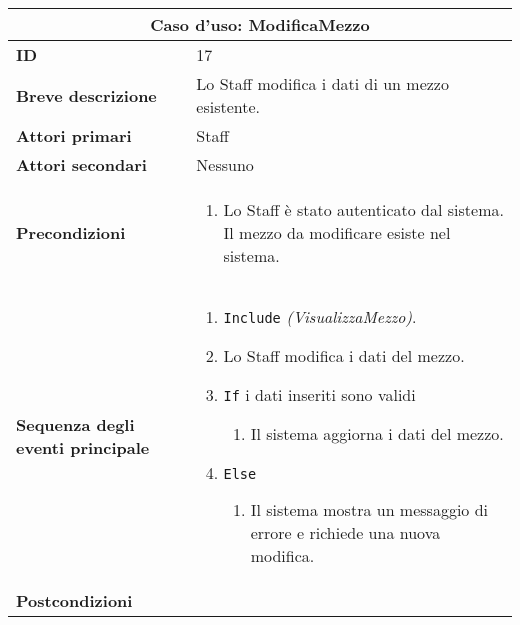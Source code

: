 \documentclass[a4paper]{report}
\begin{document}
\clearpage
\begin{table}[H]
\vspace*{-0cm}
\renewcommand{\arraystretch}{1.9}
\begin{tabular}{|p{3.9cm}|p{9.9cm}|}
\hline
\multicolumn{2}{|c|}{\textbf{Caso d’uso: ModificaMezzo}} \\ \hline
	\textbf{ID} & 17 \\ \hline
	\textbf{Breve descrizione} & Lo Staff modifica i dati di un mezzo esistente. \\ \hline
	\textbf{Attori primari} & Staff \\ \hline
	\textbf{Attori secondari} & Nessuno \\ \hline
	\textbf{Precondizioni} & \begin{enumerate}[label=\arabic*.,leftmargin=14pt,labelsep=0.5em,topsep=0pt,partopsep=0pt,parsep=0pt,itemsep=0pt]
        \item Lo Staff è stato autenticato dal sistema. Il mezzo da modificare esiste nel sistema.
    \end{enumerate} \\ \hline
	\textbf{Sequenza degli eventi principale} & 
\begin{enumerate}[leftmargin=14pt,label=\arabic*.,labelsep=0.5em,topsep=0pt,partopsep=0pt,parsep=0pt,itemsep=0pt]
    \item \texttt{Include} \textit{(VisualizzaMezzo)}.
    \item Lo Staff modifica i dati del mezzo.
    \item \texttt{If} i dati inseriti sono validi
    \begin{enumerate}[label=\arabic{enumi}.\arabic*.,leftmargin=22pt,labelsep=0.5em,topsep=0pt,partopsep=0pt,parsep=0pt,itemsep=0pt]
        \item Il sistema aggiorna i dati del mezzo.
    \end{enumerate}
    \item \texttt{Else}
    \begin{enumerate}[label=\arabic{enumi}.\arabic*.,leftmargin=22pt,labelsep=0.5em,topsep=0pt,partopsep=0pt,parsep=0pt,itemsep=0pt]
        \item Il sistema mostra un messaggio di errore e richiede una nuova modifica.
    \end{enumerate}
\end{enumerate}\\ \hline
    	\textbf{Postcondizioni} & \begin{enumerate}[label=\arabic*.,leftmargin=14pt,labelsep=0.5em,topsep=0pt,partopsep=0pt,parsep=0pt,itemsep=0pt]

\end{enumerate}
\end{tabular}
\end{table}
\end{document}
